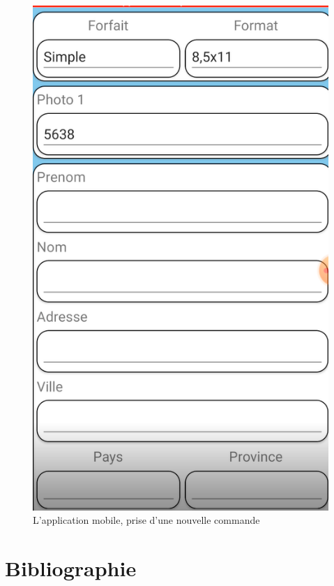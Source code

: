 \documentclass[12pt,fleqn]{article}
\begin{document}
\begin{figure}[H]
  \includegraphics{images/AppMobileNewCommand.png}
  \caption{L'application mobile, prise d'une nouvelle commande}
\end{figure}
\newpage

\section{Bibliographie}
\vspace{-0.75cm}
\renewcommand\refname{}



\nocite{*}
\end{document}
